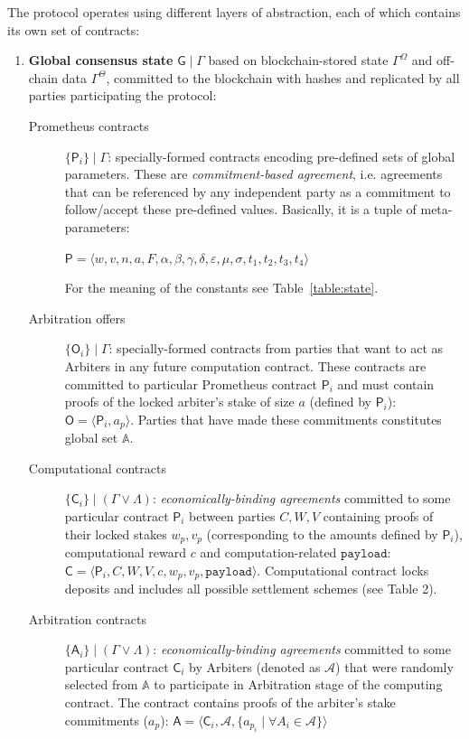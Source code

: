 \documentclass[a4paper]{article}
\begin{document}
The protocol operates using different layers of abstraction, each of which contains its own set of contracts:
\begin{enumerate}
    \item \textbf{Global consensus state} $\mathsf{G} \mid \Gamma$ based on blockchain-stored state $\Gamma^\Omega$ and off-chain data $\Gamma^\Theta$, committed to the blockchain with hashes and replicated by all parties participating the protocol:
    \begin{description}
        \item[Prometheus contracts] $\{ \mathsf{P}_i \} \mid \Gamma$: specially-formed contracts encoding pre-defined sets of global parameters. These are \textit{commitment-based agreement}, i.e. agreements that can be referenced by any independent party as a commitment to follow/accept these pre-defined values. Basically, it is a tuple of meta-parameters:
        
        $\mathsf{P} = \langle w, v, n, a, F, \alpha, \beta,  \gamma, \delta, \varepsilon, \mu, \sigma, t_1, t_2, t_3, t_4 \rangle$ 
        
        For the meaning of the constants see Table~\ref{table:state}.
        
        \item[Arbitration offers] $\{ \mathsf{O}_i \} \mid \Gamma$: specially-formed contracts from parties that want to act as Arbiters in any future computation contract. These contracts are committed to particular Prometheus contract $\mathsf{P}_i$ and must contain proofs of the locked arbiter's stake of size $a$ (defined by $\mathsf{P}_i$): $\mathsf{O} = \langle \mathsf{P}_i, a_p \rangle$. Parties that have made these commitments constitutes global set $\mathbb{A}$.
        
        \item[Computational contracts] $\{ \mathsf{C}_i \} \mid (\Gamma \vee \Lambda)$: \textit{economically-binding agreements} committed to some particular contract $\mathsf{P}_i$ between parties $C, W, V$ containing proofs of their locked stakes $w_p,v_p$ (corresponding to the amounts defined by $\mathsf{P}_i$), computational reward $c$ and computation-related $\mathtt{payload}$: $\mathsf{C} = \langle \mathsf{P}_i, C, W, V, c, w_p, v_p, \mathtt{payload} \rangle$. Computational contract locks deposits and includes all possible settlement schemes (see Table 2).
        
        \item[Arbitration contracts] $\{ \mathsf{A}_i \} \mid (\Gamma \vee \Lambda)$: \textit{economically-binding agreements}  committed to some particular contract $\mathsf{C}_i$ by Arbiters (denoted as $\mathcal{A}$) that were randomly selected from $\mathbb{A}$ to participate in Arbitration stage of the computing contract. The contract contains proofs of the arbiter's stake commitments ($a_p$): $\mathsf{A} = \langle \mathsf{C}_i, \mathcal{A}, \{ a_{p_i} \mid \forall A_i \in \mathcal{A} \} \rangle$
    \end{description}
    

\end{enumerate}
\end{document}
